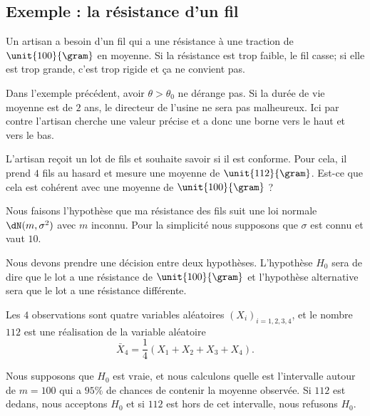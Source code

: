 \subsection{Exemple : la résistance d'un fil}
\label{subsecExempLFilResituzz}

Un artisan a besoin d'un fil qui a une résistance à une traction de \( \unit{100}{\gram}\) en moyenne. Si la résistance est trop faible, le fil casse; si elle est trop grande, c'est trop rigide et ça ne convient pas.

\begin{remark}
    Dans l'exemple précédent, avoir \( \theta>\theta_0\) ne dérange pas. Si la durée de vie moyenne est de \( 2\) ans, le directeur de l'usine ne sera pas malheureux. Ici par contre l'artisan cherche une valeur précise et a donc une borne vers le haut et vers le bas.
\end{remark}

L'artisan reçoit un lot de fils et souhaite savoir si il est conforme. Pour cela, il prend \( 4\) fils au hasard et mesure une moyenne de \( \unit{112}{\gram}\). Est-ce que cela est cohérent avec une moyenne de \( \unit{100}{\gram}\) ?

Nous faisons l'hypothèse que ma résistance des fils suit une loi normale \( \dN(m,\sigma^2)\) avec \( m\) inconnu. Pour la simplicité nous supposons que \( \sigma\) est connu et vaut \( 10\).

Nous devons prendre une décision entre deux hypothèses. L'hypothèse \( H_0\) sera de dire que le lot a une résistance de \( \unit{100}{\gram}\) et l'hypothèse alternative sera que le lot a une résistance différente.

Les \( 4\) observations sont quatre variables aléatoires \( (X_i)_{i=1,2,3,4}\), et le nombre \( 112\) est une réalisation de la variable aléatoire
\begin{equation}
    \bar X_4=\frac{1}{ 4 }(X_1+X_2+X_3+X_4).
\end{equation}

Nous supposons que \( H_0\) est vraie, et nous calculons quelle est l'intervalle autour de \( m=100\) qui a \( 95\%\) de chances de contenir la moyenne observée. Si \( 112\) est dedans, nous acceptons \( H_0\) et si \( 112\) est hors de cet intervalle, nous refusons \( H_0\).

